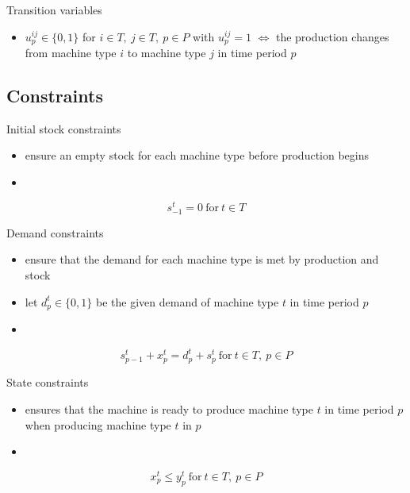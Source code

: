 \documentclass{beamer}
\begin{document}
\begin{frame}{Transition variables}
  \begin{itemize}
  \item $u^{ij}_p \in \{0,1\}$ for $i \in T,~j \in T,~p \in P$
    with $u^{ij}_p = 1$ $\Leftrightarrow$ the production changes
    from machine type $i$ to machine type $j$ in time period $p$
  \end{itemize}
\end{frame}

\subsection{Constraints}
\begin{frame}{Initial stock constraints}
  \begin{itemize}
  \item ensure an empty stock for each machine type before production begins
  \item[]
  \end{itemize}
  \begin{equation}s^{t}_{-1} = 0~\text{for}~t \in T\label{stock-cons}\end{equation}
\end{frame}

\begin{frame}{Demand constraints}
  \begin{itemize}
  \item ensure that the demand for each machine type is met by
    production and stock
  \item let $d^t_p \in \{0,1\}$ be the given demand of machine type
    $t$ in time period $p$
  \item[]
  \end{itemize}
  \begin{equation}s^t_{p-1} + x^t_p = d^t_p + s^t_p~\text{for}~t \in T,~p \in P\label{demand-cons}\end{equation}
\end{frame}

\begin{frame}{State constraints}
  \begin{itemize}
  \item ensures that the machine is ready to produce machine type $t$
    in time period $p$ when producing machine type $t$ in $p$
  \item[]
  \end{itemize}
  \begin{equation}x^t_p \leq y^t_p~\text{for}~t \in T,~p \in P\label{state-cons}\end{equation}
\end{frame}
\end{document}
